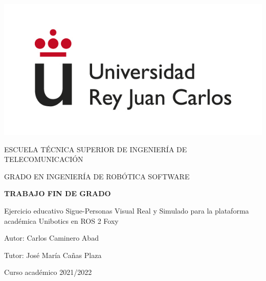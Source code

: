 \thispagestyle{empty}

\begin{titlepage}
	\begin{center}
		\vspace*{3mm}
		\begin{center}
			\includegraphics[width=0.4\linewidth]{imagenes/logo.jpg}
		\end{center}
		\vspace{6.0mm}
		
		\fontsize{15.5}{14}\selectfont ESCUELA TÉCNICA SUPERIOR DE INGENIERÍA DE TELECOMUNICACIÓN
		\vspace{13mm}
		
		\fontsize{14}{14}\selectfont GRADO EN INGENIERÍA DE ROBÓTICA SOFTWARE
		
		\vspace{70pt}
		
		\fontsize{15.7}{14}\selectfont \textbf{TRABAJO FIN DE GRADO} 
		
		\vspace{20mm}
		\begin{LARGE}
			Ejercicio educativo Sigue-Personas Visual Real y Simulado para la plataforma académica Unibotics en ROS 2 Foxy
		\end{LARGE}
		
		\vspace{20mm}
		
		\begin{large}
			Autor: Carlos Caminero Abad
			
			Tutor: José María Cañas Plaza
			
			\vspace{10mm}
		\end{large}
		\begin{normalsize}
			Curso académico 2021/2022		
		\end{normalsize}
		\vspace{10mm}
		
	\end{center}
	
\end{titlepage}

\thispagestyle{empty}